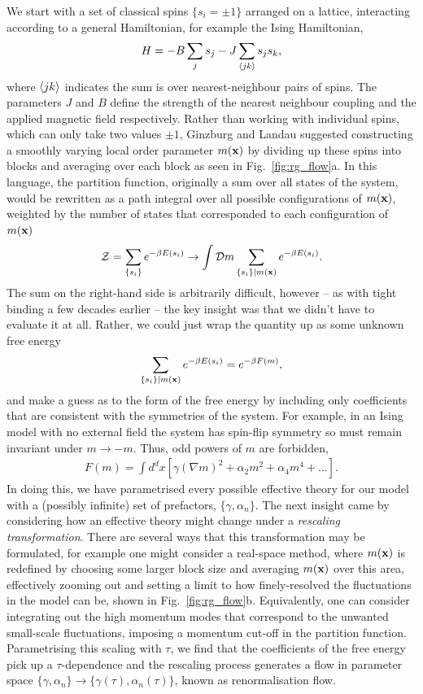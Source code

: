 We start with a set of classical spins $\{s_i = \pm 1\}$ arranged on a lattice, interacting according to a general Hamiltonian, for example the Ising Hamiltonian,
\begin{align}
    H = -B \sum_{j} s_j - J \sum_{\braket{jk}} s_j s_k,
\end{align}
where $\braket {jk}$ indicates the sum is over nearest-neighbour pairs of spins. The parameters $J$ and $B$ define the strength of the nearest neighbour coupling and the applied magnetic field respectively. Rather than working with individual spins, which can only take two values $\pm 1$, Ginzburg and Landau suggested constructing a smoothly varying local order parameter $m(\textbf x)$ by dividing up these spins into blocks and averaging over each block as seen in Fig.~\ref{fig:rg_flow}a. In this language, the partition function, originally a sum over all states of the system, would be rewritten as a path integral over all possible configurations of $m(\textbf x)$, weighted by the number of states that corresponded to each configuration of $m(\textbf x)$ 
\begin{align}
    \mathcal Z = \sum_{\{s_i\}} e^{-\beta E(s_i)} 
    \rightarrow 
    \int \mathcal D m \sum_{\{s_i\}|m(\textbf x)} e^{-\beta E(s_i)}.
\end{align}
The sum on the right-hand side is arbitrarily difficult, however -- as with tight binding a few decades earlier -- the key insight was that we didn't have to evaluate it at all. Rather, we could just wrap the quantity up as some unknown free energy
\begin{align}
    \sum_{\{s_i\}|m(\textbf x)} e^{-\beta E(s_i)} = e^{- \beta F(m)},
\end{align}
and make a guess as to the form of the free energy by including only coefficients that are consistent with the symmetries of the system. For example, in an Ising model with no external field the system has spin-flip symmetry so must remain invariant under $m \rightarrow -m$. Thus, odd powers of $m$ are forbidden,
\begin{align}
    F(m) = \int d^dx 
    \left [ 
    \gamma (\nabla m)^2 
    + \alpha_2 m^2 +  \alpha_4 m^4 + ...
    \right ].
\end{align}
In doing this, we have parametrised every possible effective theory for our model with a (possibly infinite) set of prefactors, $\{\gamma, \alpha_n\}$. The next insight came by considering how an effective theory might change under a \textit{rescaling transformation}. There are several ways that this transformation may be formulated, for example one might consider a real-space method, where $m(\textbf x)$ is redefined by choosing some larger block size and averaging $m(\textbf x)$ over this area, effectively zooming out and setting a limit to how finely-resolved the fluctuations in the model can be, shown in Fig.~\ref{fig:rg_flow}b. Equivalently, one can consider integrating out the high momentum modes that correspond to the unwanted small-scale fluctuations, imposing a momentum cut-off in the partition function. Parametrising this scaling with $\tau$, we find that the coefficients of the free energy pick up a $\tau$-dependence and the rescaling process generates a flow in parameter space $\{\gamma, \alpha_n\} \rightarrow \{\gamma(\tau), \alpha_n(\tau)\}$, known as renormalisation flow.
